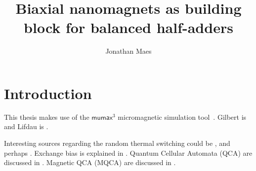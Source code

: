 \documentclass[10pt,a4paper]{article}
\author{Jonathan Maes}
\title{Biaxial nanomagnets as building block for balanced half-adders}
\newcommand{\mumax}{$\mathsf{mumax}^3$}
\begin{document}
\begin{titlingpage}
\maketitle
\end{titlingpage}

\newpage
{}

\tableofcontents
\newpage
{}

\section{Introduction}
This thesis makes use of the \mumax{} micromagnetic simulation tool~\cite{MuMax3}.
Gilbert is \cite{Gilbert1956} and Lifdau is \cite{LANDAU1992}.

Interesting sources regarding the random thermal switching could be \cite{ThermFluc_SingleDomain, RandomSwitch_MonteCarlo, Nonmonotonic_reversal}, and perhaps \cite{MagDynamics_JumpNoise}.
Exchange bias is explained in \cite{ExchangeBias, ExchangeBias_nanostructures, ExchangeBias_Mechanisms}.
Quantum Cellular Automata (QCA) are discussed in \cite{QCA_Algorithms, QCA_GameOfLife}. Magnetic QCA (MQCA) are discussed in \cite{MQCA_MajorityGate, MQCA_RoomTemp, MQCA_ImageRecognition}.
\end{document}

